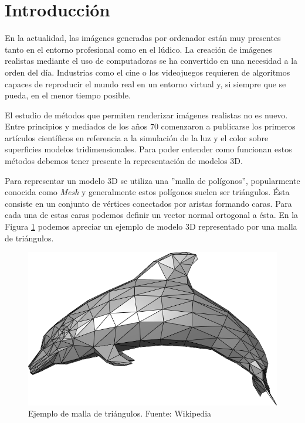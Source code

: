 \documentclass[titlepage,12pt]{article}
\begin{document}
\iftrue

\newpage
\tableofcontents*
\fi

\newpage

\section{Introducción} \label{introduction}

En la actualidad, las imágenes generadas por ordenador están muy presentes tanto en el entorno profesional como en el lúdico. La creación de imágenes realistas mediante el uso de computadoras se ha convertido en una necesidad a la orden del día. Industrias como el cine o los videojuegos requieren de algoritmos capaces de reproducir el mundo real en un entorno virtual y, si siempre que se pueda, en el menor tiempo posible.

El estudio de métodos que permiten renderizar imágenes realistas no es nuevo. Entre principios y mediados de los años 70 comenzaron a publicarse los primeros artículos científicos en referencia a la simulación de la luz y el color sobre superficies modelos tridimensionales. Para poder entender como funcionan estos métodos debemos tener presente la representación de modelos 3D. 

Para representar un modelo 3D se utiliza una ''malla de polígonos'', popularmente conocida como \textit{Mesh} y generalmente estos polígonos suelen ser triángulos. Ésta consiste en un conjunto de vértices conectados por aristas formando caras. Para cada una de estas caras podemos definir un vector normal ortogonal a ésta. En la Figura \ref{dolphin} podemos apreciar un ejemplo de modelo 3D representado por una malla de triángulos.

\begin{figure}[H]
	\centering
	\includegraphics[scale=0.15]{media/Dolphin_triangle_mesh.png}
	\caption{Ejemplo de malla de triángulos. Fuente: Wikipedia}
	\label{dolphin}
\end{figure}
\end{document}
